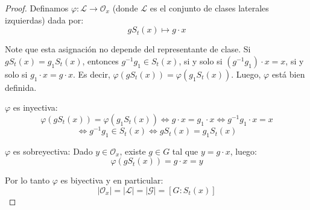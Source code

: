 \begin{proof}
    Definamos $\varphi: \mathcal{L} \to \mathcal{O}_x$ (donde $\mathcal{L}$ es el conjunto de clases laterales izquierdas) dada por:
    \begin{equation*}
        g S_t(x) \mapsto g \cdot x
    \end{equation*}

    Note que esta asignación no depende del representante de clase.
    Si $g S_t(x) = g_1 S_t(x)$, entonces $g^{-1}g_1 \in S_t(x)$, si y solo si $(g^{-1}g_1) \cdot x = x$, si y solo si $g_1 \cdot x = g \cdot x$.
    Es decir, $\varphi(g S_t(x)) = \varphi(g_1 S_t(x))$. Luego, $\varphi$ está bien definida.

    $\varphi$ es inyectiva:
    \begin{equation*}
        \varphi(g S_t(x)) = \varphi(g_1 S_t(x)) \iff g \cdot x = g_1 \cdot x \iff g^{-1}g_1 \cdot x = x
    \end{equation*}
    \begin{equation*}
        \iff g^{-1}g_1 \in S_t(x) \iff g S_t(x) = g_1 S_t(x)
    \end{equation*}

    $\varphi$ es sobreyectiva:
    Dado $y \in \mathcal{O}_x$, existe $g \in G$ tal que $y = g \cdot x$, luego:
    \begin{equation*}
        \varphi(g S_t(x)) = g \cdot x = y
    \end{equation*}

    Por lo tanto $\varphi$ es biyectiva y en particular:
    \begin{equation*}
        |\mathcal{O}_x| = |\mathcal{L}| = |\mathcal{G}| = [G : S_t(x)]
    \end{equation*}
\end{proof}
